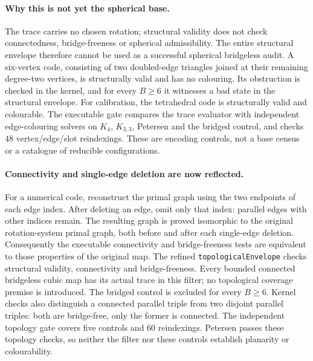 \paragraph{Why this is not yet the spherical base.}
The trace carries no chosen rotation; structural validity does not check
connectedness, bridge-freeness or spherical admissibility. The entire
structural envelope therefore cannot be used as a successful spherical
bridgeless audit. A six-vertex code, consisting of two doubled-edge
triangles joined at their remaining degree-two vertices, is structurally
valid and has no colouring. Its obstruction is checked in the kernel, and
for every $B\ge6$ it witnesses a bad state in the structural envelope.
For calibration, the tetrahedral code is structurally valid and colourable.
The executable gate compares the trace evaluator with independent
edge-colouring solvers on $K_4$, $K_{3,3}$, Petersen and the bridged control,
and checks $48$ vertex/edge/slot reindexings. These are encoding controls,
not a base census or a catalogue of reducible configurations.

\paragraph{Connectivity and single-edge deletion are now reflected.}
For a numerical code, reconstruct the primal graph using the two endpoints
of each edge index. After deleting an edge, omit only that index: parallel
edges with other indices remain. The resulting graph is proved isomorphic
to the original rotation-system primal graph, both before and after each
single-edge deletion. Consequently the executable connectivity and
bridge-freeness tests are equivalent to those properties of the original
map.
The refined \texttt{topologicalEnvelope} checks structural validity,
connectivity and bridge-freeness. Every bounded connected bridgeless cubic
map has its actual trace in this filter; no topological coverage premise
is introduced.
The bridged control is excluded for every $B\ge6$.
Kernel checks also distinguish a connected parallel triple from two
disjoint parallel triples: both are bridge-free, only the former is
connected. The independent topology gate covers five controls and $60$
reindexings. Petersen passes these topology checks, so neither the filter
nor these controls establish planarity or colourability.

